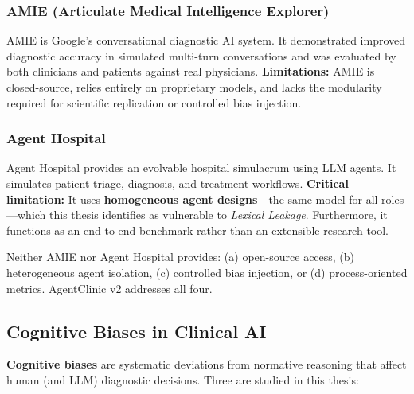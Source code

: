 \subsubsection{AMIE (Articulate Medical Intelligence Explorer)}
\begin{acadbox}[\textcolor{white}{Academic Definition}]
AMIE is Google's conversational diagnostic AI system. It demonstrated improved diagnostic accuracy in simulated multi-turn conversations and was evaluated by both clinicians and patients against real physicians. \textbf{Limitations:} AMIE is closed-source, relies entirely on proprietary models, and lacks the modularity required for scientific replication or controlled bias injection.
\end{acadbox}

\subsubsection{Agent Hospital}
\begin{acadbox}[\textcolor{white}{Academic Definition}]
Agent Hospital provides an evolvable hospital simulacrum using LLM agents. It simulates patient triage, diagnosis, and treatment workflows. \textbf{Critical limitation:} It uses \textbf{homogeneous agent designs}---the same model for all roles---which this thesis identifies as vulnerable to \textit{Lexical Leakage}. Furthermore, it functions as an end-to-end benchmark rather than an extensible research tool.
\end{acadbox}

\begin{mattersbox}[\textcolor{white}{Why It Matters for This Thesis}]
Neither AMIE nor Agent Hospital provides: (a) open-source access, (b) heterogeneous agent isolation, (c) controlled bias injection, or (d) process-oriented metrics. AgentClinic v2 addresses all four.
\end{mattersbox}

\subsection{Cognitive Biases in Clinical AI}

\begin{acadbox}[\textcolor{white}{Academic Definition}]
\textbf{Cognitive biases} are systematic deviations from normative reasoning that affect human (and LLM) diagnostic decisions. Three are studied in this thesis:
\end{acadbox}

